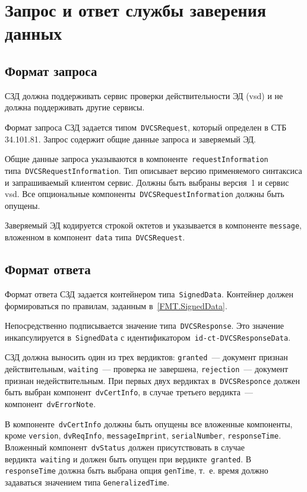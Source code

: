 \section{Запрос и ответ службы заверения данных}\label{FMT.DVCS}

\subsection{Формат запроса}\label{FMT.DVCS.Req}

СЗД должна поддерживать сервис проверки действительности ЭД (vsd) и не 
должна поддерживать другие сервисы.

Формат запроса СЗД задается типом~\texttt{DVCSRequest}, который определен  
в СТБ 34.101.81. Запрос содержит общие данные запроса и заверяемый ЭД.

Общие данные запроса указываются в компоненте~\texttt{requestInformation}
типа~\texttt{DVCSRequestInformation}. Тип описывает версию 
применяемого синтаксиса и запрашиваемый клиентом сервис. 
Должны быть выбраны версия~1 и сервис vsd. Все опциональные 
компоненты~\texttt{DVCSRequestInformation} должны быть опущены.

Заверяемый ЭД кодируется строкой октетов 
и указывается в компоненте \texttt{message}, вложенном в 
компонент~\texttt{data} типа~\texttt{DVCSRequest}.

\subsection{Формат ответа}\label{FMT.DVCS.Resp}

Формат ответа СЗД задается контейнером типа~\texttt{SignedData}.
Контейнер должен формироваться по правилам, заданным в~\ref{FMT.SignedData}. 
 
Непосредственно подписывается значение типа~\texttt{DVCSResponse}.
Это значение инкапсулируется в~\texttt{SignedData} с 
идентификатором~\texttt{id-ct-DVCSResponseData}.

СЗД должна выносить один из трех вердиктов:
\texttt{granted}~--- документ признан действительным,
\texttt{waiting}~--- проверка не завершена,
\texttt{rejection}~--- документ признан недействительным.
%
При первых двух вердиктах в~\texttt{DVCSResponce}
должен быть выбран компонент~\texttt{dvCertInfo},
в случае третьего вердикта~--- компонент~\texttt{dvErrorNote}.

В компоненте~\texttt{dvCertInfo} должны быть опущены все вложенные 
компоненты, кроме \texttt{version}, \texttt{dvReqInfo}, \texttt{messageImprint}, 
\texttt{serialNumber}, \texttt{responseTime}.
%
Вложенный компонент~\texttt{dvStatus} должен присутствовать в случае 
вердикта~\texttt{waiting} и должен быть опущен при 
вердикте~\texttt{granted}. 
%
В \texttt{responseTime} должна быть выбрана опция \texttt{genTime}, 
т.~е. время должно задаваться значением типа \texttt{GeneralizedTime}.

